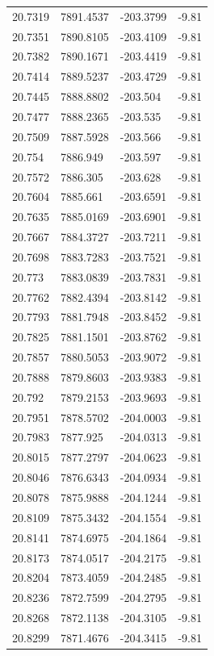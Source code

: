 \begin{table}[H]
\begin{tabular}{llll}
20.7319 & 7891.4537 & -203.3799 & -9.81 \\
20.7351 & 7890.8105 & -203.4109 & -9.81 \\
20.7382 & 7890.1671 & -203.4419 & -9.81 \\
20.7414 & 7889.5237 & -203.4729 & -9.81 \\
20.7445 & 7888.8802 & -203.504 & -9.81 \\
20.7477 & 7888.2365 & -203.535 & -9.81 \\
20.7509 & 7887.5928 & -203.566 & -9.81 \\
20.754 & 7886.949 & -203.597 & -9.81 \\
20.7572 & 7886.305 & -203.628 & -9.81 \\
20.7604 & 7885.661 & -203.6591 & -9.81 \\
20.7635 & 7885.0169 & -203.6901 & -9.81 \\
20.7667 & 7884.3727 & -203.7211 & -9.81 \\
20.7698 & 7883.7283 & -203.7521 & -9.81 \\
20.773 & 7883.0839 & -203.7831 & -9.81 \\
20.7762 & 7882.4394 & -203.8142 & -9.81 \\
20.7793 & 7881.7948 & -203.8452 & -9.81 \\
20.7825 & 7881.1501 & -203.8762 & -9.81 \\
20.7857 & 7880.5053 & -203.9072 & -9.81 \\
20.7888 & 7879.8603 & -203.9383 & -9.81 \\
20.792 & 7879.2153 & -203.9693 & -9.81 \\
20.7951 & 7878.5702 & -204.0003 & -9.81 \\
20.7983 & 7877.925 & -204.0313 & -9.81 \\
20.8015 & 7877.2797 & -204.0623 & -9.81 \\
20.8046 & 7876.6343 & -204.0934 & -9.81 \\
20.8078 & 7875.9888 & -204.1244 & -9.81 \\
20.8109 & 7875.3432 & -204.1554 & -9.81 \\
20.8141 & 7874.6975 & -204.1864 & -9.81 \\
20.8173 & 7874.0517 & -204.2175 & -9.81 \\
20.8204 & 7873.4059 & -204.2485 & -9.81 \\
20.8236 & 7872.7599 & -204.2795 & -9.81 \\
20.8268 & 7872.1138 & -204.3105 & -9.81 \\
20.8299 & 7871.4676 & -204.3415 & -9.81 \\

\end{tabular}
\end{table}
